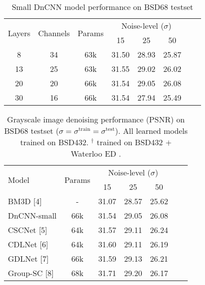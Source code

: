 \documentclass[12pt,a4paper,leqno]{amsart}
\author{Nikola Janju\v{s}evi\'{c}}
\date{\today}
\begin{document}
\begin{table}
\centering
\caption{Small DnCNN model performance on BSD68 testset}
\begin{tabular}{cccccccc} \hline
\multirow{2}{*}{Layers} & \multirow{2}{*}{Channels} & \multirow{2}{*}{Params}&\multicolumn{3}{c}{Noise-level ($\sigma$)} \\
   &    &     & 15    & 25    & 50 \\ \hline
8  & 34 & 63k & 31.50 & 28.93 & 25.87 \\
13 & 25 & 63k & 31.55 & 29.02 & 26.02 \\
20 & 20 & 66k & 31.54 & 29.05 & 26.08 \\
30 & 16 & 66k & 31.54 & 27.94 & 25.49 \\\hline
\end{tabular}
\end{table}

\begin{table}
\centering
\caption{Grayscale image denoising performance (PSNR) on BSD68 testset ($\sigma
= \sigma^{\mathrm{train}} = \sigma^{\mathrm{test}}$). All learned models
trained on BSD432\cite{bsd}. $^\dagger$ trained on BSD432 $+$ Waterloo ED
\cite{ma2017waterloo}.}
\begin{tabular}{lcccccc} \hline
\multirow{2}{*}{Model} & \multirow{2}{*}{Params} & \multicolumn{3}{c}{Noise-level ($\sigma$)} \\
 & & 15 & 25 & 50 \\ \hline
BM3D [4] &  -  & 31.07 & 28.57 & 25.62 \\
DnCNN-small & 66k & 31.54 & 29.05 & 26.08 \\
CSCNet [5] & 64k & 31.57 & 29.11 & 26.24 \\
CDLNet [6] & 64k & 31.60 & 29.11 & 26.19 \\
GDLNet [7] & 66k & 31.59 & 29.13 & 26.21 \\
Group-SC [8] & 68k & 31.71 & 29.20 & 26.17 \\ \hline
\end{tabular}
\end{table}
\end{document}
